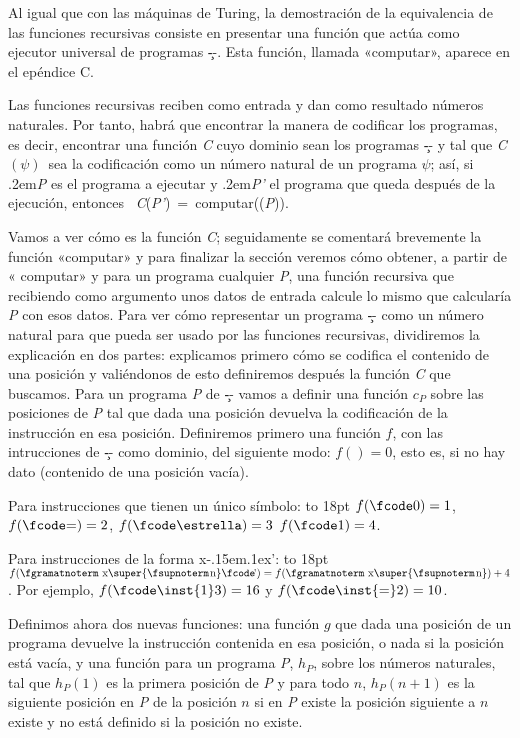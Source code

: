 Al igual que con las máquinas de Turing, la demostración de la equivalencia de las funciones
recursivas consiste en presentar una función que actúa como ejecutor universal de programas \c--.
Esta función, llamada «{\fgabrielen computar}», aparece en el epéndice C.

Las funciones recursivas reciben como entrada y dan como resultado números naturales. Por tanto,
habrá que encontrar la manera de codificar los programas, es decir, encontrar una función {\it C}
cuyo dominio sean los programas \c-- y tal que {\it C$ (\psi) $}\ sea la codificación
como un número natural de un programa $ \psi $; así, si \kern.2em{\it P\/} es el programa
a ejecutar y \kern.2em{\it P'\/} el programa que queda después de la ejecución, entonces \hbox{{\it
C}({\it P'}) = {\fgabrielen computar}(({\it P}))}.

Vamos a ver cómo es la función {\it C}; seguidamente se comentará brevemente la función
«{\fgabrielen computar}» y para finalizar la sección veremos cómo obtener, a partir de «{\fgabrielen
computar}» y para un programa cualquier {\it P}, una función recursiva que recibiendo como argumento
unos datos de entrada calcule lo mismo que calcularía {\it P} con esos datos.
Para ver cómo representar un programa \c-- como un número natural para que pueda ser usado por las
funciones recursivas, dividiremos la explicación en dos partes: explicamos primero cómo se codifica
el contenido de una posición y valiéndonos de esto definiremos después la función {\it C} que
buscamos.
Para un programa {\it P} de \c-- vamos a definir una función $ c_P $ sobre las
posiciones de {\it P} tal que dada una posición devuelva la codificación de la instrucción en esa
posición. Definiremos primero una función $ f $, con las intrucciones de \c-- como dominio, del
siguiente modo:
\listanormal
$ f()= 0$, esto es, si no hay dato (contenido de una posición vacía).\par
Para instrucciones que tienen un único símbolo:\pseudopar
\vbox to 18pt{} \hskip34pt$ f(\hbox{\fcode0})= 1$,\hskip22pt$ f(\hbox{\fcode=})=2 $,\hskip22pt $
f(\hbox{\fcode\estrella})=3 $\hskip22pt $ f(\hbox{\fcode1})=4 $.\par
Para instrucciones de la forma {\fgramatnoterm x\fcode\kern-.15em\lower.1ex\hbox{’}}:\pseudopar
\vbox to 18pt{} \hskip34pt $ f(\hbox{{\fgramatnoterm x\super{\fsupnoterm\kern.1em n}%
\fcode\kern-.15em\lower.1ex\hbox{’}}}) =f(\hbox{{\fgramatnoterm x\super{\fsupnoterm\kern.1em n}}})+4 $.
\finlista
Por ejemplo, $ f(\hbox{{\fcode\inst{1}3}})=16 $ y $ f(\hbox{{\fcode\inst{=}2}})=10 $.

Definimos ahora dos nuevas funciones: una función $ g $ que dada una posición de un programa
devuelve la instrucción contenida en esa posición, o nada si la posición está vacía, y una función
para un programa {\it P}, $ h_P $, sobre los números naturales, tal que $ h_P(1) $ es la
primera posición de {\it P} y para todo $ n $, $ h_P(n+1) $ es la siguiente posición en {\it P}
de la posición $ n $ si en {\it P} existe la posición siguiente a $ n $ existe y no está definido si
la posición no existe.
